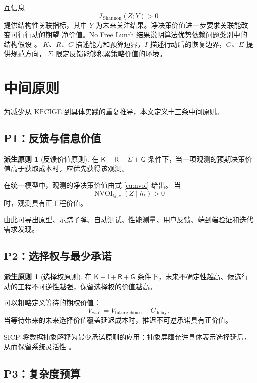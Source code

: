 \documentclass[11pt,a4paper]{ctexart}
\numberwithin{equation}{section}
\theoremstyle{definition}
\newtheorem{principle}[definition]{派生原则}
\theoremstyle{plain}
\newcommand{\Know}{\mathsf{K}}
\newcommand{\Res}{\mathsf{R}}
\newcommand{\Info}{\mathsf{I}}
\newcommand{\Goal}{\mathsf{G}}
\newcommand{\Learn}{\Sigma}
\begin{document}
互信息
\[
\mathcal I_{\mathrm{Shannon}}(Z;Y)>0
\]
提供结构性关联指标，其中 $Y$ 为未来关注结果。净决策价值进一步要求关联能改变可行行动的期望
净价值。No Free Lunch 结果说明算法优势依赖问题类别中的结构假设 \cite{wolpert1997}。
$K$、$R$、$C$ 描述能力和预算边界，$I$ 描述行动后的恢复边界，$G$、$E$ 提供规范方向，
$\Sigma$ 限定反馈能够积累策略价值的环境。

\section{中间原则}

为减少从 KRCIGE 到具体实践的重复推导，本文定义十三条中间原则。

\subsection{P1：反馈与信息价值}

\begin{principle}[反馈价值原则]
在 $\Know+\Res+\Learn+\Goal$ 条件下，当一项观测的预期决策价值高于获取成本时，应优先获得该观测。
\end{principle}

在统一模型中，观测的净决策价值由式 \eqref{eq:nvoi} 给出。
当
\[
\operatorname{NVOI}_{Q,e}(Z\mid h_t)>0
\]
时，观测具有正工程价值。

由此可导出原型、示踪子弹、自动测试、性能测量、用户反馈、端到端验证和迭代需求发现。

\subsection{P2：选择权与最少承诺}

\begin{principle}[选择权原则]
在 $\Know+\Info+\Res+\Goal$ 条件下，未来不确定性越高、候选行动的工程不可逆性越强，保留选择权的价值越高。
\end{principle}

可以粗略定义等待的期权价值：
\[
V_{\mathrm{wait}}
=
V_{\mathrm{future\ choice}}
-
C_{\mathrm{delay}}.
\]
当等待带来的未来选择价值覆盖延迟成本时，推迟不可逆承诺具有正价值。

SICP 将数据抽象解释为最少承诺原则的应用：抽象屏障允许具体表示选择延后，从而保留系统灵活性 \cite{sicp1996}。

\subsection{P3：复杂度预算}
\end{document}
